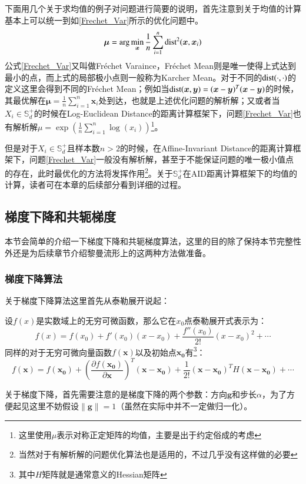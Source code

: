 下面用几个关于求均值的例子对问题进行简要的说明，首先注意到关于均值的计算基本上可以统一到如\ref{Frechet_Var}所示的优化问题中。
\begin{equation}
\label{Frechet_Var}
\bm{\mu}=\arg\min_{\bm{x}}\frac{1}{n}\sum_{i=1}^{n}{\rm dist}^{2}(\bm{x},\bm{x}_i)
\end{equation}
公式\ref{Frechet_Var}又叫做Fr\'echet Varaince，Fr\'echet Mean则是唯一使得上式达到最小的点，而上式的局部极小点则一般称为Karcher Mean。对于不同的${\rm dist}(\cdot,\cdot)$的定义这里会得到不同的Fr\'echet Mean；例如当${\rm dist}(\bm{x},\bm{y})=(\bm{x}-\bm{y})^{T}(\bm{x}-\bm{y})$的时候，其最优解在$\bm{\mu}=\frac{1}{n}\sum_{i=1}^{n}\bm{x}_i$处到达，也就是上述优化问题的解析解；又或者当$X_i\in \mathbb{S}_{d}^{+}$的时候在Log-Euclidean Distance\cite{LEM_metric}的距离计算框架下，问题\ref{Frechet_Var}也有解析解$\mu=\exp(\frac{1}{n}\sum_{i=1}^{n}\log(x_i))$\footnote{这里使用$\mu$表示对称正定矩阵的均值，主要是出于约定俗成的考虑}。

但是对于$X_i\in \mathbb{S}_{d}^{+}$且样本数$n>2$的时候，在Affine-Invariant Distance\cite{AIM_metric}的距离计算框架下，问题\ref{Frechet_Var}一般没有解析解，甚至于不能保证问题的唯一极小值点的存在，此时最优化的方法将发挥作用\footnote{当然对于有解析解的问题优化算法也是适用的，不过几乎没有这样做的必要}。关于$\mathbb{S}_{d}^{+}$在AID\cite{AIM_metric}距离计算框架下的均值的计算，读者可在本章的后续部分看到详细的过程。

\subsection{梯度下降和共轭梯度}
本节会简单的介绍一下梯度下降和共轭梯度算法，这里的目的除了保持本节完整性外还是为后续章节介绍黎曼流形上的这两种方法做准备。
\subsubsection{梯度下降算法}
关于梯度下降算法这里首先从泰勒展开说起：
\begin{definition}
设$f(x)$是实数域上的无穷可微函数，那么它在$x_0$点泰勒展开式表示为：%
\begin{equation}
\label{Taylor_Extention_1}
f(x)=f(x_0)+f'(x_0)(x-x_0)+\frac{f''(x_0)}{2!}(x-x_0)^2+\cdots
\end{equation}
同样的对于无穷可微向量函数$f(\bm{x})$以及初始点$\bm{x_0}$有\footnote{其中$H$矩阵就是通常意义的Hessian矩阵}：
\begin{equation}
\label{Taylor_Extention_d}
f(\bm{x})=f(\bm{x_0})+\left(\frac{\partial f(\bm{x_0})}{\partial \bm{x}}\right)^{T}(\bm{x-x_0})+\frac{1}{2!}(\bm{x-x_0})^{T}H(\bm{x-x_0})+\cdots
\end{equation}
\end{definition}
关于梯度下降，首先需要注意的是梯度下降的两个参数：方向$\bm{g}$和步长$\alpha$，为了方便起见这里不妨假设$\|\bm{g}\|=1$（虽然在实际中并不一定做归一化）。

